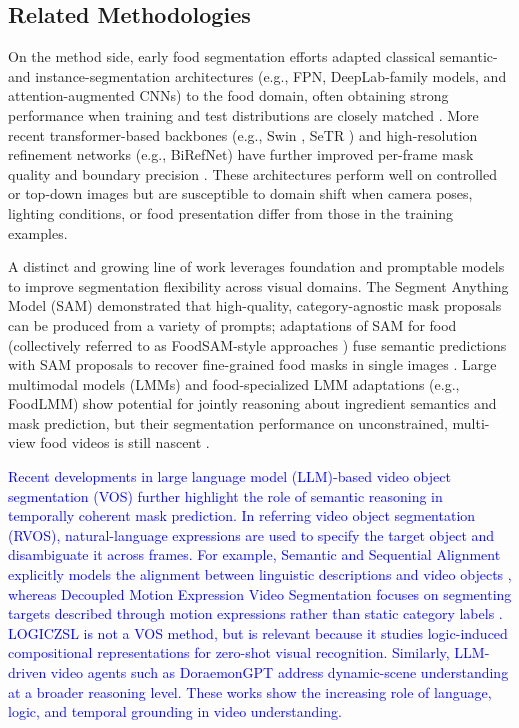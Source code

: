 \documentclass[preprint,12pt]{elsarticle}
\newcommand{\change}[1]{\textcolor{blue}{#1}}
\begin{document}
\subsection{Related Methodologies}
On the method side, early food segmentation efforts adapted classical semantic- and instance-segmentation architectures (e.g., FPN\cite{Kirillov_2019_CVPR}, DeepLab-family models, and attention-augmented CNNs\cite{huang2019ccnet}) to the food domain, often obtaining strong performance when training and test distributions are closely matched \cite{wu2021large,huang2019ccnet}. More recent transformer-based backbones (e.g., Swin \cite{liu2021swin}, SeTR \cite{zheng2021rethinking}) and high-resolution refinement networks (e.g., BiRefNet) have further improved per-frame mask quality and boundary precision \cite{zheng2021rethinking,liu2021swin,zheng2024bilateral}. These architectures perform well on controlled or top-down images but are susceptible to domain shift when camera poses, lighting conditions, or food presentation differ from those in the training examples.

A distinct and growing line of work leverages foundation and promptable models to improve segmentation flexibility across visual domains. The Segment Anything Model (SAM) \cite{kirillov2023segment} demonstrated that high-quality, category-agnostic mask proposals can be produced from a variety of prompts; adaptations of SAM for food (collectively referred to as FoodSAM-style approaches  \cite{lan2023foodsam}) fuse semantic predictions with SAM proposals to recover fine-grained food masks in single images \cite{kirillov2023segment,lan2023foodsam}. Large multimodal models (LMMs) and food-specialized LMM adaptations (e.g., FoodLMM) \cite{yin2025foodlmm} show potential for jointly reasoning about ingredient semantics and mask prediction, but their segmentation performance on unconstrained, multi-view food videos is still nascent \cite{yin2025foodlmm}.

\change{Recent developments in large language model (LLM)-based video object segmentation (VOS) further highlight the role of semantic reasoning in temporally coherent mask prediction. In referring video object segmentation (RVOS), natural-language expressions are used to specify the target object and disambiguate it across frames. For example, Semantic and Sequential Alignment explicitly models the alignment between linguistic descriptions and video objects \cite{pan2025semantic}, whereas Decoupled Motion Expression Video Segmentation focuses on segmenting targets described through motion expressions rather than static category labels \cite{fang2025decoupled}. LOGICZSL \cite{wu2025logiczsl} is not a VOS method, but is relevant because it studies logic-induced compositional representations for zero-shot visual recognition. Similarly, LLM-driven video agents such as DoraemonGPT \cite{yang2024doraemongpt} address dynamic-scene understanding at a broader reasoning level. These works show the increasing role of language, logic, and temporal grounding in video understanding.}
\end{document}

